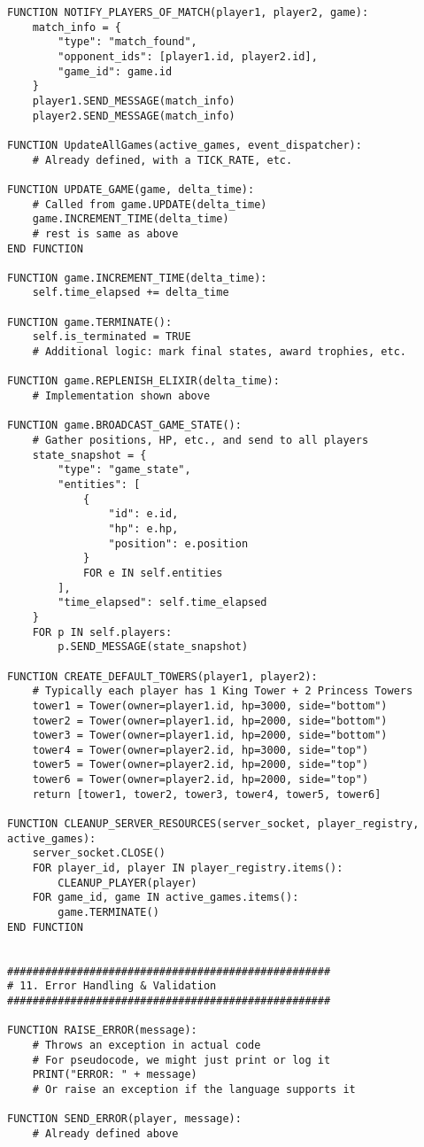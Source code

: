 \documentclass{article}
\begin{document}
\begin{lstlisting}[style=pseudo]
FUNCTION NOTIFY_PLAYERS_OF_MATCH(player1, player2, game):
    match_info = {
        "type": "match_found",
        "opponent_ids": [player1.id, player2.id],
        "game_id": game.id
    }
    player1.SEND_MESSAGE(match_info)
    player2.SEND_MESSAGE(match_info)

FUNCTION UpdateAllGames(active_games, event_dispatcher):
    # Already defined, with a TICK_RATE, etc.

FUNCTION UPDATE_GAME(game, delta_time):
    # Called from game.UPDATE(delta_time)
    game.INCREMENT_TIME(delta_time)
    # rest is same as above
END FUNCTION

FUNCTION game.INCREMENT_TIME(delta_time):
    self.time_elapsed += delta_time

FUNCTION game.TERMINATE():
    self.is_terminated = TRUE
    # Additional logic: mark final states, award trophies, etc.

FUNCTION game.REPLENISH_ELIXIR(delta_time):
    # Implementation shown above

FUNCTION game.BROADCAST_GAME_STATE():
    # Gather positions, HP, etc., and send to all players
    state_snapshot = {
        "type": "game_state",
        "entities": [
            {
                "id": e.id,
                "hp": e.hp,
                "position": e.position
            } 
            FOR e IN self.entities
        ],
        "time_elapsed": self.time_elapsed
    }
    FOR p IN self.players:
        p.SEND_MESSAGE(state_snapshot)

FUNCTION CREATE_DEFAULT_TOWERS(player1, player2):
    # Typically each player has 1 King Tower + 2 Princess Towers
    tower1 = Tower(owner=player1.id, hp=3000, side="bottom")
    tower2 = Tower(owner=player1.id, hp=2000, side="bottom")
    tower3 = Tower(owner=player1.id, hp=2000, side="bottom")
    tower4 = Tower(owner=player2.id, hp=3000, side="top")
    tower5 = Tower(owner=player2.id, hp=2000, side="top")
    tower6 = Tower(owner=player2.id, hp=2000, side="top")
    return [tower1, tower2, tower3, tower4, tower5, tower6]

FUNCTION CLEANUP_SERVER_RESOURCES(server_socket, player_registry, active_games):
    server_socket.CLOSE()
    FOR player_id, player IN player_registry.items():
        CLEANUP_PLAYER(player)
    FOR game_id, game IN active_games.items():
        game.TERMINATE()
END FUNCTION


###################################################
# 11. Error Handling & Validation
###################################################

FUNCTION RAISE_ERROR(message):
    # Throws an exception in actual code
    # For pseudocode, we might just print or log it
    PRINT("ERROR: " + message)
    # Or raise an exception if the language supports it

FUNCTION SEND_ERROR(player, message):
    # Already defined above

\end{lstlisting}
\end{document}
